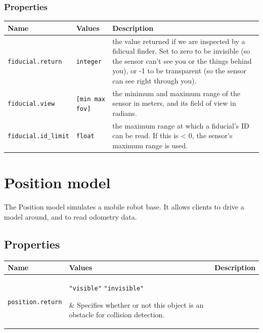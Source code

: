 \documentclass[letter,11pt,twoside]{report}
\begin{document}
\subsubsection*{Properties}
\begin{tabularx}{\columnwidth}{llX}
\hline
Name & Values & Description \\
\hline

\verb'fiducial.return' & \verb'integer' & the value returned if we are
inspected by a fidicual finder. Set to zero to be invisible (so the
sensor can't see you or the things behind you), or -1 to be
transparent (so the sensor can see right through you).\\

\verb'fiducial.view' & \verb'[min max fov]' & the minimum and
maximum range of the sensor in meters, and its field of view in
radians.\\

\verb'fiducial.id_limit' & \verb'float' & the maximum range at which a
fiducial's ID can be read. If this is < 0, the sensor's maximum range
is used.\\ \hline
\end{tabularx}

\newpage
\section{Position model}

The Position model simulates a mobile robot base. It allows clients to
drive a model around, and to read odometry data.

\subsection*{Properties}
\begin{tabularx}{\columnwidth}{llX}
\hline
Name & Values & Description \\
\hline

\verb'position.return' & \parbox{30mm}{\verb'"visible"'
\verb'"invisible"'} & Specifies whether or not this object is an
obstacle for collision detection.\\

\\
\hline
\end{tabularx}
\end{document}
